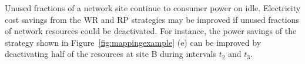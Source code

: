Unused fractions of a network site continue to consumer power on idle. Electricity cost savings from the WR and RP strategies may be improved if unused fractions of network resources could be deactivated. For instance, the power savings of the strategy shown in Figure~\ref{fig:mappingexample} (e) can be improved by deactivating half of the resources at site B during intervals $t_2$ and $t_3$. 

%
%
